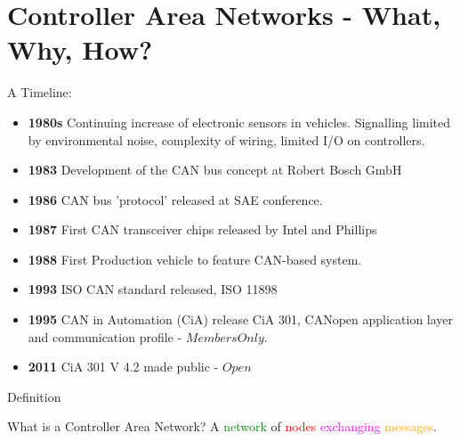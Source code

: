 \documentclass{beamer}
\begin{document}
  \section{Controller Area Networks - What, Why, How?}
    \begin{frame}
      \begin{Huge}{A Timeline:}\end{Huge}
      \begin{itemize}
      \item{\textbf{1980s} Continuing increase of electronic sensors in vehicles. Signalling limited by environmental noise, complexity of wiring, limited I/O on controllers.}
        \pause
        \item{\textbf{1983} Development of the CAN bus concept at Robert Bosch GmbH}
          \pause
        \item{\textbf{1986} CAN bus 'protocol' released at SAE conference.}
          \pause
        \item{\textbf{1987} First CAN transceiver chips released by Intel and Phillips}
          \pause
        \item{\textbf{1988} First Production vehicle to feature CAN-based system.}
          \pause
        \item{\textbf{1993} ISO CAN standard released, ISO 11898}
          \pause
        \item{\textbf{1995} CAN in Automation (CiA) release CiA 301, CANopen application layer and communication profile -  $Members Only$.}
          \pause
        \item{\textbf{2011} CiA 301 V 4.2 made public - $Open$}
      \end{itemize}
  \end{frame}
    
    \begin{frame}{Definition}
      \begin{block}{What is a Controller Area Network?}
        A \textcolor{green}{network} of \textcolor{red}{nodes} \textcolor{magenta}{exchanging} \textcolor{orange}{messages}.
      \end{block}      
    \end{frame}
\end{document}
